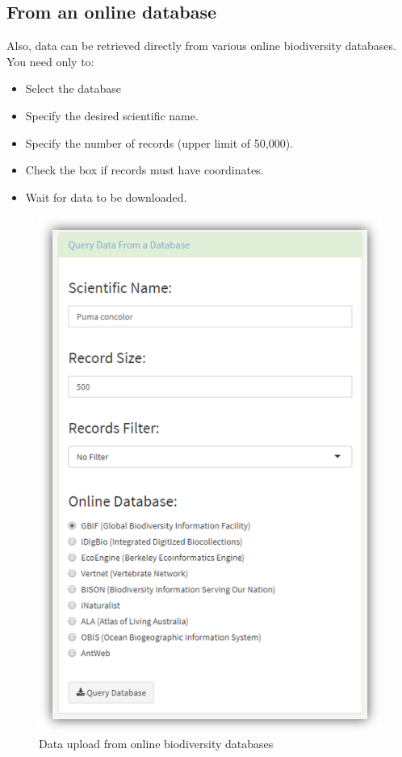 \documentclass[]{book}
\providecommand{\tightlist}{%
  \setlength{\itemsep}{0pt}\setlength{\parskip}{0pt}}
\theoremstyle{definition}
\theoremstyle{definition}
\theoremstyle{definition}
\theoremstyle{remark}
\begin{document}
\subsection{From an online database}\label{from-an-online-database}

Also, data can be retrieved directly from various online biodiversity
databases. You need only to:

\begin{itemize}
\tightlist
\item
  Select the database
\item
  Specify the desired scientific name.
\item
  Specify the number of records (upper limit of 50,000).
\item
  Check the box if records must have coordinates.
\item
  Wait for data to be downloaded.
\end{itemize}

\begin{figure}
\centering
\includegraphics{img/bdchecks_Up-database.png}
\caption{Data upload from online biodiversity databases}
\end{figure}
\end{document}
